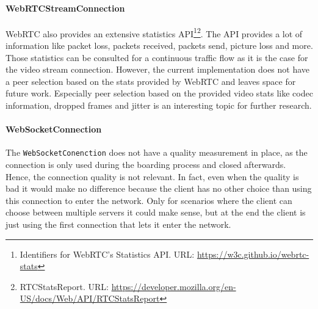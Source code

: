 \paragraph{WebRTCStreamConnection}
WebRTC also provides an extensive statistics API\footnote{Identifiers for WebRTC's Statistics API. URL: \url{https://w3c.github.io/webrtc-stats}}\footnote{RTCStatsReport. URL: \url{https://developer.mozilla.org/en-US/docs/Web/API/RTCStatsReport}}. The API provides a lot of information like packet loss, packets received, packets send, picture loss and more. Those statistics can be consulted for a continuous traffic flow as it is the case for the video stream connection. However, the current implementation does not have a peer selection based on the stats provided by WebRTC and leaves space for future work. Especially peer selection based on the provided video stats like codec information, dropped frames and jitter is an interesting topic for further research.

\paragraph{WebSocketConnection}
The \lstinline|WebSocketConenction| does not have a quality measurement in place, as the connection is only used during the boarding process and closed afterwards. Hence, the connection quality is not relevant. In fact, even when the quality is bad it would make no difference because the client has no other choice than using this connection to enter the network. Only for scenarios where the client can choose between multiple \signal servers it could make sense, but at the end the client is just using the first connection that lets it enter the network.


